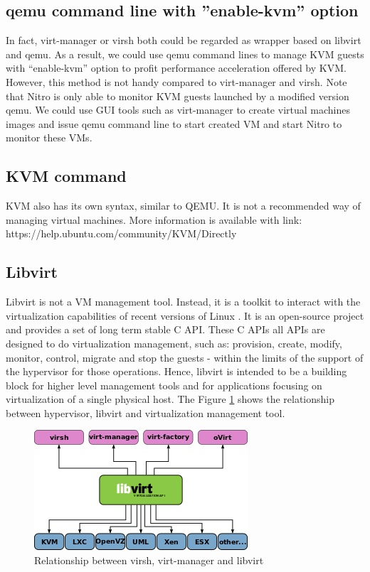 \subsection{qemu command line with ''enable-kvm'' option}
In fact, virt-manager or virsh both could be regarded as wrapper based on libvirt and qemu. 
As a result, we could use qemu command lines to manage KVM guests with “enable-kvm” option to profit performance acceleration offered by KVM. 
However, this method is not handy compared to virt-manager and virsh. 
Note that Nitro is only able to monitor KVM guests launched by a modified version qemu. 
We could use GUI tools such as virt-manager to create virtual machines images and issue qemu command line to start created VM and start Nitro to monitor these VMs.

\subsection{KVM command}
KVM also has its own syntax, similar to QEMU. 
It is not a recommended way of managing virtual machines. 
More information is available with link: https://help.ubuntu.com/community/KVM/Directly

\subsection{Libvirt}
Libvirt is not a VM management tool. Instead, it is a toolkit to interact with the virtualization capabilities of recent versions of Linux 
\cite{Reference23}. It is an open-source project and provides a set of long term stable C API. These C APIs all APIs are designed to do 
virtualization management, such as: provision, create, modify, monitor, control, migrate and stop the guests - within the limits of the support
of the hypervisor for those operations. Hence, libvirt is intended to be a building block for higher level management tools and for applications
focusing on virtualization of a single physical host. The Figure \ref{fig:Relationship between virsh, virt-manager and libvirt} shows the 
relationship between hypervisor, libvirt and virtualization management tool.

\begin{figure}[htbp]
	\centering
		\includegraphics[scale = 1.2]{Figures/Figure8.png}
	\caption[Relationship between virsh, virt-manager and libvirt]{Relationship between virsh, virt-manager and libvirt \cite{Reference25}}
	\label{fig:Relationship between virsh, virt-manager and libvirt}
\end{figure}

